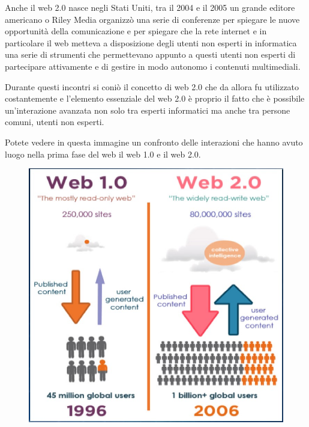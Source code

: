   Anche il web 2.0 nasce negli Stati Uniti, tra il 2004 e il 2005 un grande editore americano o Riley Media organizzò una serie di conferenze per spiegare le nuove opportunità della comunicazione e per spiegare che la rete internet e in particolare il web metteva a disposizione degli utenti non esperti in informatica una serie di strumenti che permettevano appunto a questi utenti non esperti di partecipare attivamente e di gestire in modo autonomo i contenuti multimediali. \par
  Durante questi incontri si coniò il concetto di web 2.0 che da allora fu utilizzato costantemente e l'elemento essenziale del web 2.0 è proprio il fatto che è possibile un'interazione avanzata non solo tra esperti informatici ma anche tra persone comuni, utenti non esperti. \par
  Potete vedere in questa immagine un confronto delle interazioni che hanno avuto luogo nella prima fase del web il web 1.0 e il web 2.0.
  
  \begin{figure}[h]
      \centering
      \includegraphics[width=0.75\linewidth]{images/06_lez_fig_01.jpg}
  \end{figure}
  
